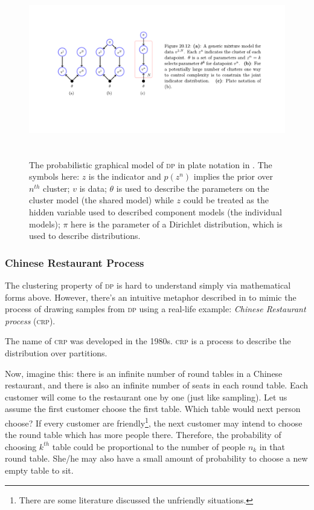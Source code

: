 \documentclass{ar-1col}
\begin{document}
\begin{figure}
    \includegraphics[width=6in, height=3in]{images/Dirichlet.pdf}
    \caption{The probabilistic graphical model of \textsc{dp} in plate notation in \citet{Barber2012}. The symbols here: $z$ is the indicator and $p(z^n)$ implies the prior over $n^{th}$ cluster; $v$ is data; $\theta$ is used to describe the parameters on the cluster model (the shared model) while $z$ could be treated as the hidden variable used to described component models (the individual models); $\pi$ here is the parameter of a Dirichlet distribution, which is used to describe distributions.}
    \label{fig:Dirichlet}
\end{figure}


\subsubsection{Chinese Restaurant Process}

The clustering property of \textsc{dp} is hard to understand simply via mathematical forms above. 
However, there's an intuitive metaphor described in \citet{Teh2006} to mimic the process of drawing samples from \textsc{dp} using a real-life example: \textit{Chinese Restaurant process} (\textsc{crp}).

The name of \textsc{crp} was developed in the 1980s. 
\textsc{crp} is a process to describe the distribution over partitions.

Now, imagine this: there is an infinite number of round tables in a Chinese restaurant, and there is also an infinite number of seats in each round table. 
Each customer will come to the restaurant one by one (just like sampling). 
Let us assume the first customer choose the first table.
Which table would next person choose?
If every customer are friendly\footnote{There are some literature discussed the unfriendly situations.}, the next customer may intend to choose the round table which has more people there.
Therefore, the probability of choosing $k^{th}$ table could be proportional to the number of people $n_k$ in that round table.
She/he may also have a small amount of probability to choose a new empty table to sit.
\end{document}
